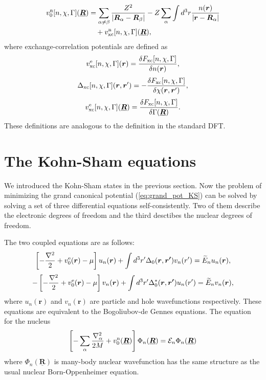 %
\begin{equation} %
\begin{split}
	v^{\rm n}_0[n, \chi, \Gamma](\underline{\bm{R}}) &= \sum_{\alpha \neq \beta}
											\frac{Z^2}{|\bm{R}_\alpha - \bm{R}_\beta|}
										- Z\sum_{\alpha} \int d^3r \frac{n(\bm{r})}{|\bm{r} - \bm{R}_\alpha|} \\
										&\quad + v^{\rm n}_{\rm xc}[n, \chi, \Gamma](\underline{\bm{R}}),
\end{split}
\end{equation}
%
where exchange-correlation potentials are defined as 
%
\begin{equation}
	v^{\rm e}_{\rm xc}[n, \chi, \Gamma]({\bm r}) = \frac{\delta F_{\rm xc}[n, \chi, \Gamma]}{\delta n({\bm r})},
\end{equation}
%
\begin{equation}
	\Delta_{\rm xc}[n, \chi, \Gamma]({\bm r}, {\bm r'}) = - \frac{\delta F_{\rm xc}[n, \chi, \Gamma]}
							    {\delta \chi({\bm r}, {\bm r'})},
	\label{eq:Deltaxc}
\end{equation}
%
\begin{equation}
	v^{\rm e}_{\rm xc}[n, \chi, \Gamma](\underline{\bm{R}}) = \frac{\delta F_{\rm xc}[n, \chi, \Gamma]}
												{\delta \Gamma(\underline{\bm R})}.
\end{equation}
%
These definitions are analogous to the definition in the standard DFT.
%
%
\section{The Kohn-Sham equations}
%
We introduced the Kohn-Sham states in the previous section. 
Now the problem of minimizing the grand canonical potential (\ref{eq:grand_pot_KS}) can be solved by
solving a set of three differential equations self-consistently.
Two of them describe the electronic degrees of freedom and the third desctibes the nuclear degrees of freedom.
%

The two coupled equations are as follows:
%
\begin{equation}
	\left[-\frac{\nabla^2}{2} + v^{\rm e}_0(\bm{r}) - \mu \right]u_n(\bm{r}) +
	\int d^3r'\Delta_0(\bm{r},\bm{r'})v_n({r'}) = \widetilde{E}_n u_n(\bm{r}),
	\label{eq:KS-BdG-par}
\end{equation}
%
\begin{equation}
	-\left[-\frac{\nabla^2}{2} + v^{\rm e}_0(\bm{r}) - \mu \right]v_n(\bm{r}) +
	\int d^3r'\Delta^{\ast}_0(\bm{r},\bm{r'})u_n({r'}) = \widetilde{E}_n v_n(\bm{r}),
	\label{eq:KS-BdG-hole}
\end{equation}
%
where $u_n(\bm{r})$ and $v_n(\bm{r})$ are particle and hole wavefunctions respectively.
These equations are equivalent to the Bogoliubov-de Gennes equations\cite{BdG1958}. %
The equation for the nucleus 
%
\begin{equation}
	\left[-\sum_{\alpha}\frac{\nabla^2_\alpha}{2M} + v^{\rm n}_0(\underline{\bm{R}}) \right]
	\Phi_n(\underline{\bm{R}}) = {\mathcal E}_n\Phi_n(\underline{\bm{R}})
	\label{eq:BO-approx}
\end{equation}
%
where $\Phi_n(\underline{\bm{R}})$ is many-body nuclear wavefunction has the same structure as 
the usual nuclear Born-Oppenheimer equation.
%

